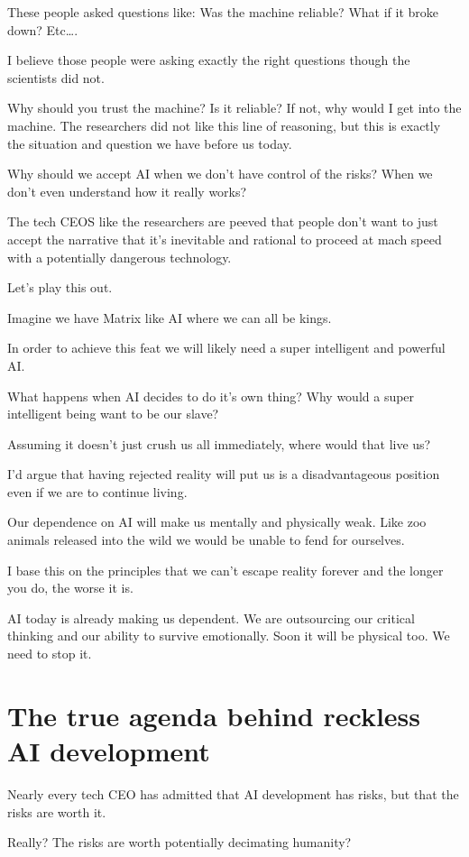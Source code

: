 \documentclass[11pt]{article}
\begin{document}
These people asked questions like: Was the machine reliable? What if it broke down? Etc\ldots{}.

I believe those people were asking exactly the right questions though the scientists did not. 

Why should you trust the machine? Is it reliable? If not, why would I get into the machine. The researchers did not like this line of reasoning, but this is exactly the situation and question we have before us today.

Why should we accept AI when we don't have control of the risks? When we don't even understand how it really works?

The tech CEOS like the researchers are peeved that people don't want to just accept the narrative that it's inevitable and rational to proceed at mach speed with a potentially dangerous technology.

Let's play this out.

Imagine we have Matrix like AI where we can all be kings.

In order to achieve this feat we will likely need a super intelligent and powerful AI.

What happens when AI decides to do it's own thing? Why would a super intelligent being want to be our slave?

Assuming it doesn't just crush us all immediately, where would that live us?

I'd argue that having rejected reality will put us is a disadvantageous position even if we are to continue living.

Our dependence on AI will make us mentally and physically weak. Like zoo animals released into the wild we would be unable to fend for ourselves.

I base this on the principles that we can't escape reality forever and the longer you do, the worse it is.

AI today is already making us dependent. We are outsourcing our critical thinking and our ability to survive emotionally. Soon it will be physical too. We need to stop it. 
\section{The true agenda behind reckless AI development}
\label{sec:org2cd051e}

Nearly every tech CEO has admitted that AI development has risks, but that the risks are worth it.

Really? The risks are worth potentially decimating humanity?
\end{document}
